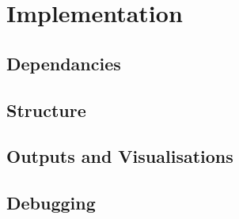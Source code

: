 \section{Implementation} \label{implementation}
\subsection{Dependancies}
\subsection{Structure}
\subsection{Outputs and Visualisations}
\subsection{Debugging}
